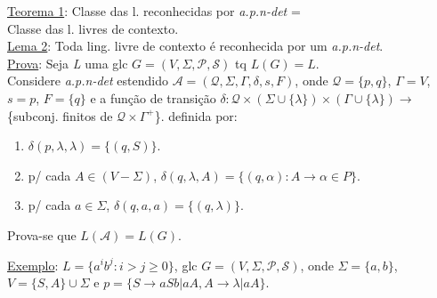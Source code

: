 \documentclass{article}
\begin{document}
\underline{Teorema 1}: Classe das l. reconhecidas por \emph{a.p.n-det} = \\
                        Classe das l. livres de contexto.
\vspace{0.5cm}\\
\underline{Lema 2}: Toda ling. livre de contexto é reconhecida por um \emph{a.p.n-det}.\\
\underline{Prova}: Seja \emph{L} uma glc $ G = (V,\Sigma,\mathcal{P},\mathcal{S}) $ tq $ L(G) = L $.\\
Considere \emph{a.p.n-det} estendido $ \mathcal{A} = (\mathcal{Q}, \Sigma, \Gamma, \delta, s, F) $, onde 
$ \mathcal{Q} = \{p,q\} $, $\Gamma = V $, $ s = p $, $ F = \{q\} $ e a função de transição
$ \delta : \mathcal{Q} \times (\Sigma \cup \{\lambda\}) \times (\Gamma \cup \{\lambda\} ) \rightarrow $ 
    \{subconj. finitos de $ \mathcal{Q} \times \Gamma^+ $\}. definida por:
    
    \begin{enumerate}
        \item $ \delta(p, \lambda, \lambda) = \{(q,S)\} $.
        \item p/ cada $ A \in (V-\Sigma) $, $\delta(q, \lambda, A ) = \{ (q,\alpha) : A \rightarrow \alpha \in P \} $.
        \item p/ cada $ a \in \Sigma $, $\delta(q, a, a ) = \{ (q,\lambda)\} $.
    \end{enumerate}
    
    Prova-se que $ L(\mathcal{A}) = L(G) $.
    
\underline{Exemplo}: $ L = \{ a^ib^j : i > j \geq 0 \} $, glc $ G = (V,\Sigma, \mathcal{P}, \mathcal{S}) $,
    onde $ \Sigma = \{a,b\} $, $ V = \{S,A\} \cup \Sigma $ e $ p = \{ S \rightarrow aSb | aA, A \rightarrow \lambda |aA\}$.
    
\end{document}

